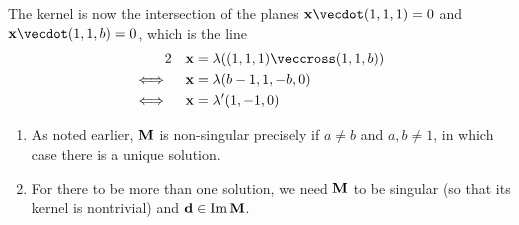 \documentclass[fleqn,a4paper,11pt]{article}
\begin{document}
\begin{enumerate}[label=\textbf{\arabic*.}]
\begin{itemize}
      The kernel is now the intersection of the planes
      \(\vec x \vecdot(1, 1, 1) = 0\) and \(\vec x \vecdot (1, 1, b) = 0\),
      which is the line
     \begin{alignat*}2
      &&\vec x &= \lambda((1, 1, 1) \veccross (1, 1, b)) \\
      \iff{}&&\vec x &= \lambda(b - 1, 1, - b, 0) \\
      \iff{}&&\vec x &= \lambda'(1, -1, 0)
     \end{alignat*}
   \end{itemize}
   \begin{enumerate}[label=(\roman*)]
    \item
     As noted earlier, \(\mathbf{M}\) is non-singular precisely if
     \(a \ne b\) and \(a, b \ne 1\), in which case there is a unique solution.
    \item \label{item_ii}
     For there to be more than one solution, we need \(\mathbf{M}\) to be singular
     (so that its kernel is nontrivial) and \(\mathrm{\mathbf{d}} \in \operatorname{Im} \mathbf{M}\).


\end{enumerate}
\end{enumerate}
\end{document}

